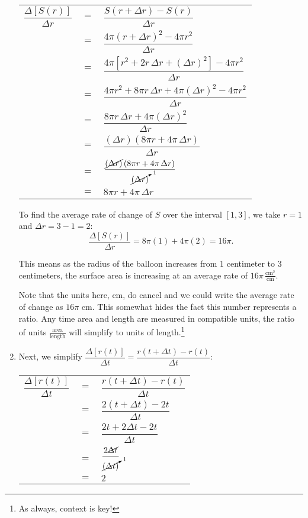 \documentclass{ximera}
\begin{document}
\begin{ex}
\begin{enumerate}
\begin{longtable}{rcl}
 $\dfrac{\Delta[S(r)]}{\Delta r}$ & $=$ &$\dfrac{S(r+ \Delta r) - S(r)}{\Delta r}$   \\[10pt]
                       & $=$ &   $\dfrac{4 \pi (r + \Delta r)^2 - 4 \pi r^2}{\Delta r}$ \\[10pt]
                       & $=$ &$ \dfrac{4 \pi \left[r^2  + 2 r \, \Delta r + (\Delta r)^2\right] - 4 \pi r^2}{\Delta r}$ \\[10pt]   
                         &$=$ &    $\dfrac{4 \pi r^2  + 8 \pi  r \, \Delta r + 4 \pi (\Delta r)^2 - 4 \pi r^2}{\Delta r}$  \\[10pt]   
                         & $=$ &  $\dfrac{8 \pi  r \, \Delta r + 4 \pi (\Delta r)^2 }{\Delta r}$   \\[10pt]
                         & $=$ &  $\dfrac{(\Delta r) \left(8 \pi  r + 4 \pi \, \Delta r \right) }{\Delta r}$  \\[10pt]
                         & $=$ &  $\dfrac{\cancel{(\Delta r)} \left(8 \pi  r + 4 \pi \, \Delta r \right) }{\cancelto{1}{(\Delta r)}}$   \\[10pt]
                         & $=$ & $8 \pi r + 4 \pi \, \Delta r$ \\ \end{longtable}
                         
To find the average rate of change of $S$ over the interval $[1,3]$, we take $r = 1$ and $\Delta r = 3  - 1 = 2$: \[ \dfrac{\Delta[S(r)]}{\Delta r} = 8 \pi (1) + 4\pi (2) = 16 \pi.\]  

\medskip

This means as the radius of the balloon increases from $1$ centimeter to $3$ centimeters, the surface area is increasing at an average rate of  $16 \pi \, \frac{\text{cm}^2}{\text{cm}} $.

\medskip

Note that the units  here, cm, do cancel and we could write the average rate of change as  $16 \pi$ cm.  This somewhat hides the fact this number represents a ratio.  Any time area and length are measured in compatible units, the ratio of units $\frac{\text{area}}{\text{length}}$ will simplify to units of length.\footnote{As always, context is key!}


\item  Next, we simplify  $\dfrac{\Delta[r(t)]}{\Delta t} = \dfrac{r(t+ \Delta t) - r(t)}{\Delta t}$:

\begin{longtable}{rcl}

$ \dfrac{\Delta[r(t)]}{\Delta t}$ & $=$ & $\dfrac{r(t+ \Delta t) - r(t)}{\Delta t}$ \\[10pt]
                          &$=$ &   $\dfrac{2(t+\Delta t)- 2t}{\Delta t}$ \\[10pt]
                                  & $=$ &   $\dfrac{2t + 2 \Delta t - 2t}{\Delta t}$ \\[10pt]
                                     & $=$ &   $\dfrac{ 2 \cancel{\Delta t} }{\cancelto{1}{(\Delta t)}}$ \\[10pt]
                         &$=$ &    $2$ \\ \end{longtable}
                         

\end{enumerate}
\end{ex}
\end{document}
